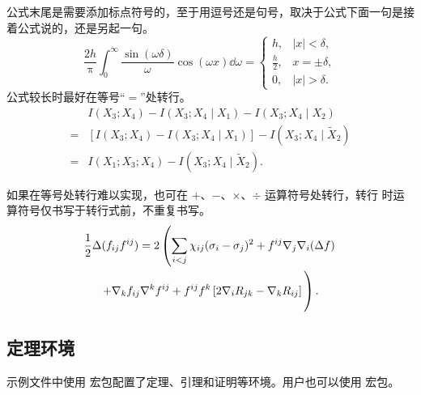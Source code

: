 \documentclass{sjtureport}
\begin{document}
公式末尾是需要添加标点符号的，至于用逗号还是句号，取决于公式下面一句是接着公式说的，还是另起一句。
\begin{equation}
	\frac{2h}{\uppi}\int_{0}^{\infty}\frac{\sin\left( \omega\delta \right)}{\omega}
	\cos\left( \omega x \right) \dd\omega =
	\begin{cases}
		h,           & \left| x \right| < \delta, \\
		\frac{h}{2}, & x = \pm \delta,            \\
		0,           & \left| x \right| > \delta.
	\end{cases}
\end{equation}
公式较长时最好在等号“$=$”处转行。
\begin{align}
	  & I (X_3; X_4) - I (X_3; X_4 \mid X_1) - I (X_3; X_4 \mid X_2) \nonumber \\
	= & [I (X_3; X_4) - I (X_3; X_4 \mid X_1)] - I (X_3; X_4 \mid \tilde{X}_2) \\
	= & I (X_1; X_3; X_4) - I (X_3; X_4 \mid \tilde{X}_2).
\end{align}

如果在等号处转行难以实现，也可在 $+$、$-$、$\times$、$\div$ 运算符号处转行，转行
时运算符号仅书写于转行式前，不重复书写。
\begin{multline}
	\frac{1}{2} \Delta (f_{ij} f^{ij}) =
	2 \left(\sum_{i<j} \chi_{ij}(\sigma_{i} - \sigma_{j})^{2}
	+ f^{ij} \nabla_{j} \nabla_{i} (\Delta f) \right. \\
	\left. + \nabla_{k} f_{ij} \nabla^{k} f^{ij} +
	f^{ij} f^{k} \left[2\nabla_{i}R_{jk}
		- \nabla_{k} R_{ij} \right] \vphantom{\sum_{i<j}} \right).
\end{multline}

\subsection{定理环境}

示例文件中使用  宏包配置了定理、引理和证明等环境。用户也可以使用
 宏包。
\end{document}

